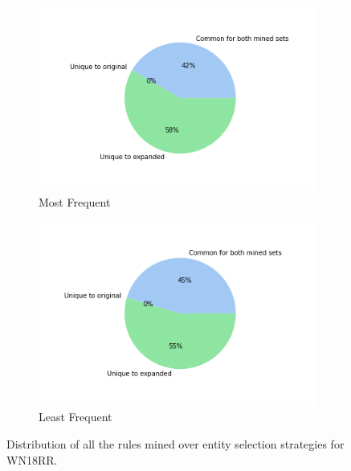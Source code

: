 \begin{figure}[htb]
        \begin{subfigure}[b]{0.49\textwidth}   
            \centering 
            \includegraphics[width=\textwidth]{figures/results/entity_selection/pie_charts/most_frequent_wn18rr.png}
            \caption[]%
            {{\small Most Frequent}}    
            \label{fig:most_pie_wn18rr}
        \end{subfigure}
        \hfill
        \begin{subfigure}[b]{0.49\textwidth}   
            \centering 
            \includegraphics[width=\textwidth]{figures/results/entity_selection/pie_charts/least_frequent_wn18rr.png}
            \caption[]%
            {{\small Least Frequent}}    
            \label{fig:least_pie_wn18rr}
        \end{subfigure}
        \caption[]
        {\small Distribution of all the rules mined over entity selection strategies for WN18RR.} 
        \label{fig:entity_pies_wn18rr}
    \end{figure}
    
